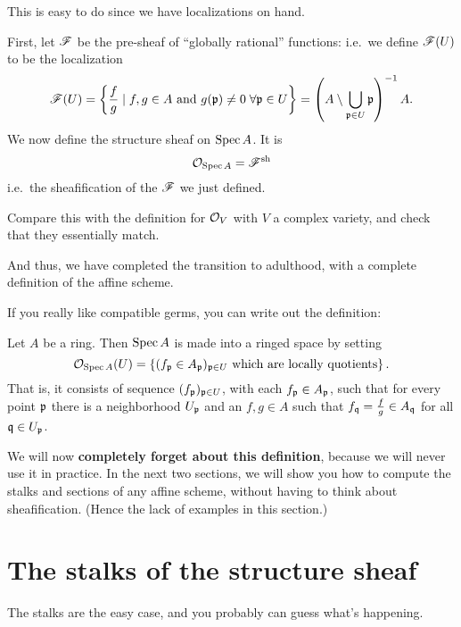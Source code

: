 This is easy to do since we have localizations on hand.
\begin{definition}
	First, let $\mathscr F$ be the pre-sheaf of ``globally rational'' functions:
	i.e.\ we define $\mathscr F(U)$ to be the localization
	\[
		\mathscr F(U) = \left\{
			\frac fg \mid f, g \in A
			\text{ and } g(\mathfrak p) \neq 0 \; \forall \mathfrak p \in U
		\right\}
		= \left(A \setminus \bigcup_{\mathfrak p \in U} \mathfrak p \right)^{-1} A.
	\]
	We now define the structure sheaf on $\operatorname{Spec} A$.
	It is
	\[ \mathcal O_{\operatorname{Spec} A} = \mathscr F^\mathrm{sh} \]
	i.e.\ the sheafification of the $\mathscr F$ we just defined.
\end{definition}
\begin{exercise}
	Compare this with the definition for $\mathcal O_V$
	with $V$ a complex variety, and check that they essentially match.
\end{exercise}
And thus, we have completed the transition to adulthood,
with a complete definition of the affine scheme.

If you really like compatible germs,
you can write out the definition:
\begin{definition}
	Let $A$ be a ring.
	Then $\operatorname{Spec} A$ is made into a ringed space by setting
	\[ \mathcal O_{\operatorname{Spec} A}(U)
		= \left\{ (f_\mathfrak p \in A_\mathfrak p)_{\mathfrak p \in U}
		\text{ which are locally quotients} \right\}. \]
	That is, it consists of sequence $(f_\mathfrak p)_{\mathfrak p \in U}$, with
	each $f_\mathfrak p \in A_\mathfrak p$, such that for every point $\mathfrak p$ there
	is a neighborhood $U_\mathfrak p$ and an $f,g \in A$ such that
	$f_\mathfrak q = \frac fg \in A_\mathfrak q$ for all $\mathfrak q \in U_\mathfrak p$.
\end{definition}

We will now \textbf{completely forget about this definition},
because we will never use it in practice.
In the next two sections, we will show you how to compute
the stalks and sections of any affine scheme, without having
to think about sheafification.
(Hence the lack of examples in this section.)

\section{The stalks of the structure sheaf}
The stalks are the easy case,
and you probably can guess what's happening.

